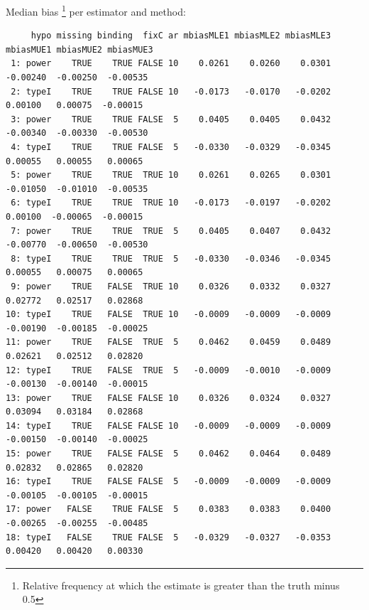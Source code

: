 \documentclass[12pt]{article}
\begin{document}
Median bias \footnote{Relative frequency at which the estimate is greater than the truth minus 0.5} per estimator and method:
\begin{adjustwidth}{-1cm}{-1cm}
\begin{verbatim}
     hypo missing binding  fixC ar mbiasMLE1 mbiasMLE2 mbiasMLE3 mbiasMUE1 mbiasMUE2 mbiasMUE3
 1: power    TRUE    TRUE FALSE 10    0.0261    0.0260    0.0301  -0.00240  -0.00250  -0.00535
 2: typeI    TRUE    TRUE FALSE 10   -0.0173   -0.0170   -0.0202   0.00100   0.00075  -0.00015
 3: power    TRUE    TRUE FALSE  5    0.0405    0.0405    0.0432  -0.00340  -0.00330  -0.00530
 4: typeI    TRUE    TRUE FALSE  5   -0.0330   -0.0329   -0.0345   0.00055   0.00055   0.00065
 5: power    TRUE    TRUE  TRUE 10    0.0261    0.0265    0.0301  -0.01050  -0.01010  -0.00535
 6: typeI    TRUE    TRUE  TRUE 10   -0.0173   -0.0197   -0.0202   0.00100  -0.00065  -0.00015
 7: power    TRUE    TRUE  TRUE  5    0.0405    0.0407    0.0432  -0.00770  -0.00650  -0.00530
 8: typeI    TRUE    TRUE  TRUE  5   -0.0330   -0.0346   -0.0345   0.00055   0.00075   0.00065
 9: power    TRUE   FALSE  TRUE 10    0.0326    0.0332    0.0327   0.02772   0.02517   0.02868
10: typeI    TRUE   FALSE  TRUE 10   -0.0009   -0.0009   -0.0009  -0.00190  -0.00185  -0.00025
11: power    TRUE   FALSE  TRUE  5    0.0462    0.0459    0.0489   0.02621   0.02512   0.02820
12: typeI    TRUE   FALSE  TRUE  5   -0.0009   -0.0010   -0.0009  -0.00130  -0.00140  -0.00015
13: power    TRUE   FALSE FALSE 10    0.0326    0.0324    0.0327   0.03094   0.03184   0.02868
14: typeI    TRUE   FALSE FALSE 10   -0.0009   -0.0009   -0.0009  -0.00150  -0.00140  -0.00025
15: power    TRUE   FALSE FALSE  5    0.0462    0.0464    0.0489   0.02832   0.02865   0.02820
16: typeI    TRUE   FALSE FALSE  5   -0.0009   -0.0009   -0.0009  -0.00105  -0.00105  -0.00015
17: power   FALSE    TRUE FALSE  5    0.0383    0.0383    0.0400  -0.00265  -0.00255  -0.00485
18: typeI   FALSE    TRUE FALSE  5   -0.0329   -0.0327   -0.0353   0.00420   0.00420   0.00330
\end{verbatim}

\end{adjustwidth}

\clearpage
\end{document}
